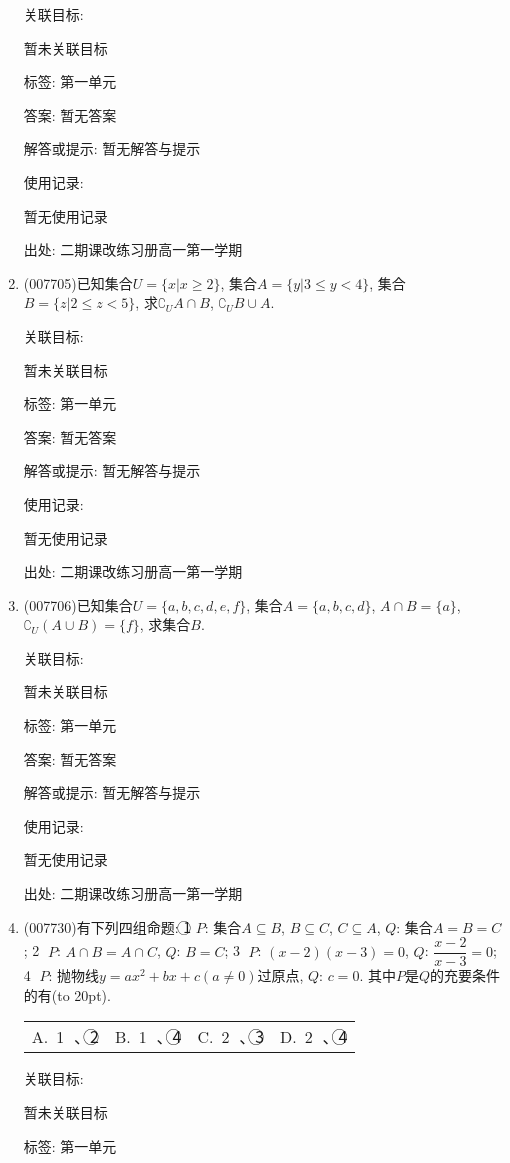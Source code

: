 \documentclass[10pt,a4paper]{article}
\newcommand{\bracket}[1]{(\hbox to #1pt{})}
\newcommand{\fourch}[4]{\par\begin{tabular}{p{.23\textwidth}p{.23\textwidth}p{.23\textwidth}p{.23\textwidth}}
A.~#1 &B.~#2& C.~#3& D.~#4
\end{tabular}}
\begin{document}
\begin{enumerate}[1.]
关联目标:

暂未关联目标



标签: 第一单元

答案: 暂无答案

解答或提示: 暂无解答与提示

使用记录:

暂无使用记录


出处: 二期课改练习册高一第一学期
\item { (007705)}已知集合$U=\{x|x\ge 2\}$, 集合$A=\{y|3\le y<4\}$, 集合$B=\{z|2\le z<5\}$, 求$\complement _UA\cap B$, $\complement _UB\cup A$.


关联目标:

暂未关联目标



标签: 第一单元

答案: 暂无答案

解答或提示: 暂无解答与提示

使用记录:

暂无使用记录


出处: 二期课改练习册高一第一学期
\item { (007706)}已知集合$U=\{a,b,c,d,e,f\}$, 集合$A=\{a,b,c,d\}$, $A\cap B=\{a\}$, $\complement _U(A\cup B)=\{f\}$, 求集合$B$.


关联目标:

暂未关联目标



标签: 第一单元

答案: 暂无答案

解答或提示: 暂无解答与提示

使用记录:

暂无使用记录


出处: 二期课改练习册高一第一学期
\item { (007730)}有下列四组命题:
\textcircled{1} $P$: 集合$A\subseteq B$, $B\subseteq C$, $C\subseteq A$, 		$Q$: 集合$A=B=C$;
\textcircled{2} $P$: $A\cap B=A\cap C$, 					$Q$: $B=C$;
\textcircled{3} $P$: $(x-2)(x-3)=0$, 				$Q$: $\dfrac{x-2}{x-3}=0$;
\textcircled{4} $P$: 抛物线$y=ax^2+bx+c(a\ne 0)$过原点, $Q$: $c=0$.
其中$P$是$Q$的充要条件的有\bracket{20}.
\fourch{\textcircled{1} 、\textcircled{2} }{\textcircled{1} 、\textcircled{4} }{\textcircled{2} 、\textcircled{3} }{\textcircled{2} 、\textcircled{4}}


关联目标:

暂未关联目标



标签: 第一单元


\end{enumerate}
\end{document}
